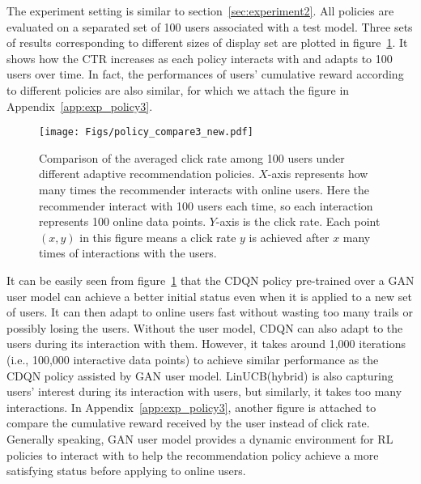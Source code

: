\documentclass{article} %
\newcommand{\Li}[1]{{\color{cyan}{\bf\sf [Li: #1]}}}
\begin{document}
The experiment setting is similar to section~\ref{sec:experiment2}. All policies are evaluated on a separated set of 100 users associated with a test model.
Three sets of results corresponding to different sizes of display set are plotted in figure~\ref{fg:experiment3}. It shows how the CTR increases as each policy interacts with and adapts to 100 users over time. In fact, the performances of users' cumulative reward according to different policies are also similar, for which we attach the figure in Appendix~\ref{app:exp_policy3}.

\begin{figure}[htbp]
\vspace{-4mm}
    \centering
    \texttt{[image: Figs/policy\_compare3\_new.pdf]}
    \vspace{-5mm}
\caption{\small Comparison of the averaged click rate among 100 users under different adaptive recommendation policies. $X$-axis represents how many times the recommender interacts with online users. Here the recommender interact with 100 users each time, so each interaction represents 100 online data points. $Y$-axis is the click rate. Each point $(x,y)$ in this figure means a click rate $y$ is achieved after $x$ many times of interactions with the users. \Li{suggest using different line type to make this figure more clear} }
\label{fg:experiment3}
\vspace{-3mm}
\end{figure}

It can be easily seen from figure~\ref{fg:experiment3} that the CDQN policy pre-trained over a GAN user model can achieve a better initial status even when it is applied to a new set of users. It can then adapt to online users fast without wasting too many trails or possibly losing the users. Without the user model, CDQN can also adapt to the users during its interaction with them. However, it takes around 1,000 iterations (i.e., 100,000 interactive data points) to achieve similar performance as the CDQN policy assisted by GAN user model. LinUCB(hybrid) is also capturing users' interest during its interaction with users, but similarly, it takes too many interactions. In Appendix~\ref{app:exp_policy3}, another figure is attached to compare the cumulative reward received by the user instead of click rate. Generally speaking, GAN user model provides a dynamic environment for RL policies to interact with to help the recommendation policy achieve a more satisfying status before applying to online users.
\end{document}
